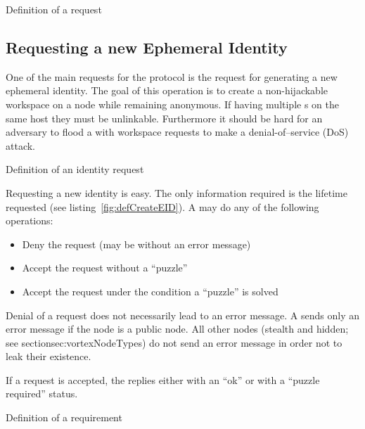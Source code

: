 \begin{lstfloat}[ht]
	
	\caption{Definition of a request}
	\label{fig:defReply}
\end{lstfloat}

\subsection{Requesting a new Ephemeral Identity\label{sec:newEID}}
One of the main requests for the protocol is the request for generating a new ephemeral identity. The goal of this operation is to create a non-hijackable workspace on a node while remaining anonymous. If having multiple s on the same host they must be unlinkable. Furthermore it should be hard for an adversary to flood a \VortexNode{} with workspace requests to make a denial-of--service (DoS) attack.

\begin{lstfloat}[ht]
	
	\caption{Definition of an identity request}
	\label{fig:defCreateEID}
\end{lstfloat}

Requesting a new identity is easy. The only information required is the lifetime requested (see listing~\ref{fig:defCreateEID}). A \VortexNode may do any of the following operations:
\begin{itemize}
	\item Deny the request (may be without an error message)
	\item Accept the request without a ``puzzle''
	\item Accept the request under the condition a ``puzzle'' is solved
\end{itemize}

Denial of a request does not necessarily lead to an error message. A \VortexNode{} sends only an error message if the node is a public node. All other nodes (stealth and hidden; see section{sec:vortexNodeTypes}) do not send an error message in order not to leak their existence.

If a request is accepted, the \VortexNode replies either with an ``ok'' or with a ``puzzle required'' status.

\begin{lstfloat}[ht]
	
	\caption{Definition of a requirement}
	\label{fig:defRequirements}
\end{lstfloat}

